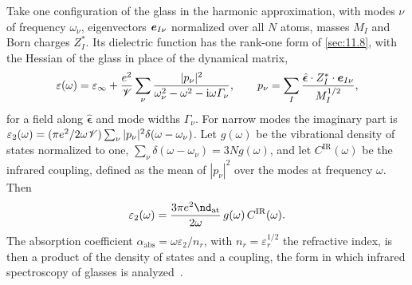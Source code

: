 Take one configuration of the glass in the harmonic approximation, with modes $\nu$ of frequency $\omega_\nu$, eigenvectors $\bm{e}_{I\nu}$ normalized over all $N$ atoms, masses $M_I$ and Born charges $Z^*_I$. Its dielectric function has the rank-one form of \cref{sec:11.8}, with the Hessian of the glass in place of the dynamical matrix,
\begin{equation}
  \varepsilon(\omega) = \varepsilon_\infty + \frac{e^2}{\mathscr{V}}\sum_\nu\frac{|p_\nu|^2}{\omega_\nu^2 - \omega^2 - \mathrm{i}\omega\varGamma_\nu} ,
  \qquad p_\nu = \sum_I\frac{\hat{\boldsymbol{\epsilon}}\cdot Z^*_I\cdot\bm{e}_{I\nu}}{M_I^{1/2}} ,
  \label{eq:16.7-epsglass}
\end{equation}
for a field along $\hat{\boldsymbol{\epsilon}}$ and mode widths $\varGamma_\nu$. For narrow modes the imaginary part is $\varepsilon_2(\omega) = (\pi e^2/2\omega\mathscr{V})\sum_\nu|p_\nu|^2\delta(\omega - \omega_\nu)$. Let $g(\omega)$ be the vibrational density of states normalized to one, $\sum_\nu\delta(\omega - \omega_\nu) = 3Ng(\omega)$, and let $C^{\mathrm{IR}}(\omega)$ be the infrared coupling, defined as the mean of $|p_\nu|^2$ over the modes at frequency $\omega$. Then
\begin{equation}
  \varepsilon_2(\omega) = \frac{3\pi e^2\nd_{\mathrm{at}}}{2\omega}\,g(\omega)\,C^{\mathrm{IR}}(\omega) .
  \label{eq:16.7-eps2}
\end{equation}
The absorption coefficient $\alpha_{\mathrm{abs}} = \omega\varepsilon_2/n_r$, with $n_r = \varepsilon_r^{1/2}$ the refractive index, is then a product of the density of states and a coupling, the form in which infrared spectroscopy of glasses is analyzed~\cite[Eq.~(2) and text before Eq.~(1)]{taraskin2006universal}.

